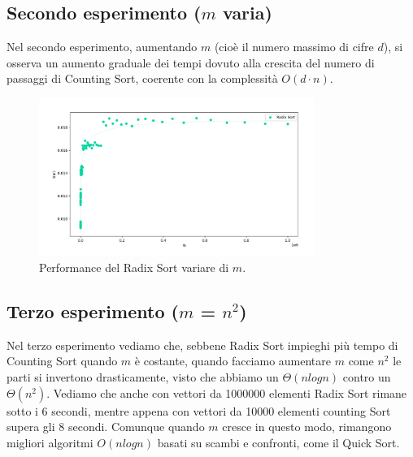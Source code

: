 \documentclass[a4paper, 12pt, oneside]{book}
\begin{document}
\subsection{Secondo esperimento ($m$ varia)}

Nel secondo esperimento, aumentando \(m\) (cioè il numero massimo di cifre \(d\)), si osserva un aumento graduale dei tempi dovuto alla crescita del numero di passaggi di Counting Sort, coerente con la complessità \(O(d \cdot n)\).

\begin{figure}[H]
    \centering
    \includegraphics[width=0.8\textwidth]{images/grafico_radix_sort_m.png}
    \caption{Performance del Radix Sort variare di \(m\).}
    \label{fig:radix_sort_3_way_m}
\end{figure}

\subsection{Terzo esperimento ($m$ = $n^2$)}

Nel terzo esperimento vediamo che, sebbene Radix Sort impieghi più tempo di Counting Sort quando \(m\) è costante, quando facciamo aumentare \(m\) come \(n^2\) le parti si invertono drasticamente, visto che abbiamo un \(\Theta(nlogn)\) contro un \(\Theta(n^2)\).
Vediamo che anche con vettori da 1000000 elementi Radix Sort rimane sotto i 6 secondi, mentre appena con vettori da 10000 elementi counting Sort supera gli 8 secondi. Comunque quando \(m\) cresce in questo modo, rimangono migliori algoritmi \(O(nlogn)\) basati su scambi e confronti, come il Quick Sort.
\end{document}
